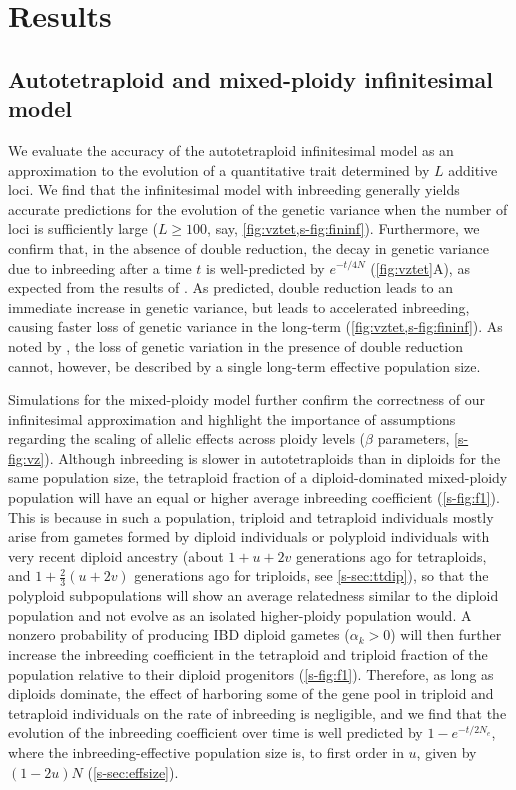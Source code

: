 \documentclass[11pt,a4paper]{article}
\begin{document}
\section*{Results}

\subsection*{Autotetraploid and mixed-ploidy infinitesimal model}

We evaluate the accuracy of the autotetraploid infinitesimal model as an
approximation to the evolution of a quantitative trait determined by $L$
additive loci.
We find that the infinitesimal model with inbreeding generally yields accurate
predictions for the evolution of the genetic variance when the number of loci
is sufficiently large ($L \ge 100$, say, \cref{fig:vztet,s-fig:fininf}).
Furthermore, we confirm that, in the absence of double reduction, the decay in
genetic variance due to inbreeding after a time $t$ is well-predicted by
$e^{-t/4N}$ (\cref{fig:vztet}A), as expected from the results of \cite{arnold2012}.
As predicted, double reduction leads to an immediate increase in genetic
variance, but leads to accelerated inbreeding, causing faster loss of genetic
variance in the long-term (\cref{fig:vztet,s-fig:fininf}).
As noted by \cite{arnold2012}, the loss of genetic variation in the presence of
double reduction cannot, however, be described by a single long-term effective
population size.

Simulations for the mixed-ploidy model further confirm the correctness of our
infinitesimal approximation and highlight the importance of assumptions
regarding the scaling of allelic effects across ploidy levels
($\beta$ parameters, \cref{s-fig:vz}).
Although inbreeding is slower in autotetraploids than in diploids for the same
population size, the tetraploid fraction of a diploid-dominated mixed-ploidy 
population will have an equal or higher average inbreeding coefficient
(\cref{s-fig:f1}).
This is because in such a population, triploid and tetraploid individuals
mostly arise from gametes formed by diploid individuals or polyploid
individuals with very recent diploid ancestry (about $1+u+2v$ generations ago
for tetraploids, and $1+\frac{2}{3}(u+2v)$ generations ago for triploids, see
\cref{s-sec:ttdip}), so that the polyploid subpopulations will show an average
relatedness similar to the diploid population and not evolve as an isolated
higher-ploidy population would.
A nonzero probability of producing IBD diploid gametes ($\alpha_k > 0$) will
then further increase the inbreeding coefficient in the tetraploid and triploid
fraction of the population relative to their diploid progenitors
(\cref{s-fig:f1}).
Therefore, as long as diploids dominate, the effect of harboring some of the
gene pool in triploid and tetraploid individuals on the rate of inbreeding is
negligible, and we find that the evolution of the inbreeding coefficient over
time is well predicted by $1-e^{-t/2N_e}$, where the inbreeding-effective
population size is, to first order in $u$, given by $(1-2u)N$
(\cref{s-sec:effsize}). 
\end{document}
